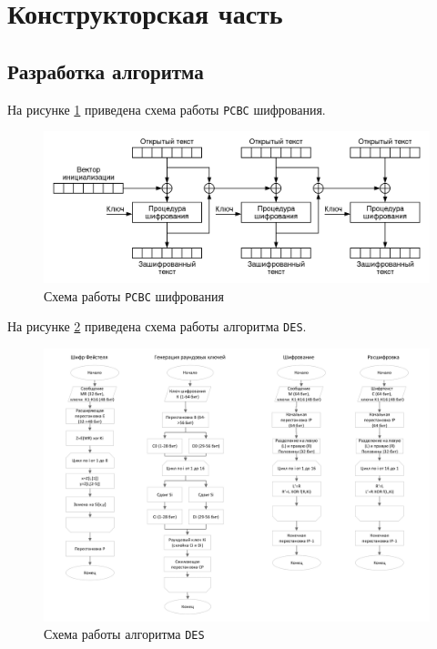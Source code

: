 \clearpage

\section{Конструкторская часть}

\subsection{Разработка алгоритма}

На рисунке \ref{fig:pcbc} приведена схема работы \texttt{PCBC} шифрования.

\begin{figure}[ht!]
	\centering
	\includegraphics[width=1\linewidth]{assets/images/PCBC_Encryption_ru.png}
	\caption{Схема работы \texttt{PCBC} шифрования}
	\label{fig:pcbc}
\end{figure}

На рисунке \ref{fig:des} приведена схема работы алгоритма \texttt{DES}.

\begin{figure}[ht!]
	\centering
	\includegraphics[width=1\linewidth]{assets/images/DES-1.png}
	\caption{Схема работы алгоритма \texttt{DES}}
	\label{fig:des}
\end{figure}

